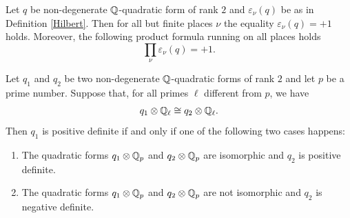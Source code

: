 \begin{theorem}
\notready\label{productformula}
Let $q$ be non-degenerate $\mathbb{Q}$-quadratic form of rank $2$ and $\varepsilon_\nu(q)$ be as in Definition \ref{Hilbert}. Then for all but finite places $\nu$ the equality $\varepsilon_\nu(q)=+1$ holds. Moreover, the following product formula running on all places holds
\[\prod_\nu  \varepsilon_\nu(q)= +1.\]
\end{theorem}

\begin{corollary}
\notready\label{signaturetop}
Let $q_1$ and $q_2$  be two non-degenerate $\mathbb{Q}$-quadratic forms of rank $2$ and let $p$ be a prime number. Suppose that, for all primes $\ell$ different from $p$, we have
\[q_1 \otimes \mathbb{Q}_\ell \cong q_2 \otimes \mathbb{Q}_\ell.\]
Then $q_1$ is positive definite if and only if one of the following two cases happens:
\begin{enumerate}
\item  The quadratic forms $q_1\otimes \mathbb{Q}_p$ and $q_2\otimes \mathbb{Q}_p$ are isomorphic and $q_2$ is positive definite.
\item  The quadratic forms $q_1\otimes \mathbb{Q}_p$ and $q_2\otimes \mathbb{Q}_p$ are not isomorphic and $q_2$ is negative definite.
\end{enumerate}
\end{corollary}
